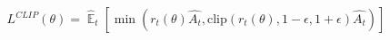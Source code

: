 \documentclass[preview]{standalone}
\begin{document}
\begin{align*}
L^{CLIP}(\theta) = \hat{\mathop{\mathbb{E}}}_t \left[ \min ( r_t(\theta) \hat{A_t} , \text{clip} ( r_t(\theta) , 1-\epsilon, 1+\epsilon ) \hat{A_t} ) \right]
\end{align*}
\end{document}
